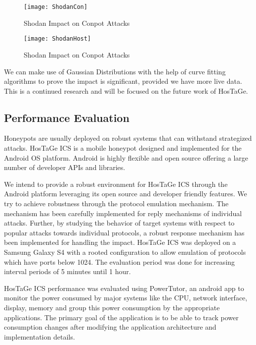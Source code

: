 \documentclass[article,msc=informatik,type=msc,colorback,accentcolor=tud9c]{tudthesis}
\begin{document}
	\begin{figure}[H]
	\centering
	\texttt{[image: ShodanCon]}
	\caption[Shodan Impact on Conpot Attacks ]{\label{f:Shodan Impact on Conpot Attacks}Shodan Impact on Conpot Attacks}
	\end{figure}
	\begin{figure}
	  \centering
	  \texttt{[image: ShodanHost]}
	  \caption[Shodan Impact on HosTaGe ICS Attacks ]{\label{f:Shodan Impact on HosTaGe ICS Attacks}Shodan Impact on Conpot Attacks}
	\end{figure}



	We can make use of Gaussian Distributions with the help of curve fitting algorithms to prove the impact is significant, provided we have more live data.  This is a continued research and will be focused on the future work of HosTaGe.  
	
	\vspace{5mm} 
	\subsection{Performance Evaluation}	\label{:Performance Evaluation}
	
		
	Honeypots are usually deployed on robust systems that can withstand strategized attacks. HosTaGe ICS is a mobile honeypot designed and implemented for the Android \ac{OS} platform. Android is highly flexible and open source offering a large number of developer \ac{API}s and libraries. 
	
		
	We intend to provide a robust environment for HosTaGe ICS through the Android platform leveraging its open source and developer friendly features. We try to achieve robustness through the protocol emulation mechanism. The mechanism has been carefully implemented for reply mechanisms of individual attacks. Further, by studying the behavior of target systems with respect to popular attacks towards individual protocols, a robust response mechanism has been implemented for handling the impact. HosTaGe ICS was deployed on a Samsung Galaxy S4 with a rooted configuration to allow emulation of protocols which have ports below 1024. The evaluation period was done for increasing interval periods of 5 minutes until 1 hour.


	HosTaGe ICS performance was evaluated using PowerTutor\cite{yang2012powertutor}, an android app to monitor the power consumed by major systems like the CPU, network interface, display, memory and group this power consumption by the appropriate applications. The primary goal of the application is to be able to track power consumption changes after modifying the application architecture and implementation details.
\end{document}
